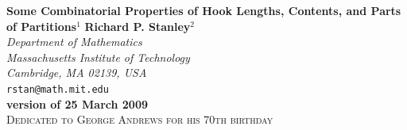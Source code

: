 \documentclass[12pt]{article}
\theoremstyle{definition}
\theoremstyle{remark}
\begin{document}
\newcommand{\beq}{\begin{equation}} 
\newcommand{\eeq}{\end{equation}}
\newcommand{\zz}{\mathbb{Z}}
\newcommand{\pp}{\mathbb{P}} 
\newcommand{\nn}{\mathbb{N}}
\newcommand{\qq}{\mathbb{Q}}
\newcommand{\rr}{\mathbb{R}}
\newcommand{\parn}{\mathrm{Par}(n)}
\newcommand{\bm}[1]{{\mbox{\boldmath $#1$}}}
\newcommand{\con}{\mathrm{Comp}(n)}
\newcommand{\sn}{\mathfrak{S}_n} 
\newcommand{\fs}{\mathfrak{S}}
\newcommand{\st}{\,:\,} 
\newcommand{\as}{\mathrm{as}}
\newcommand{\is}{\mathrm{is}}
\newcommand{\lgn}{\mathrm{len}}
\newcommand{\dis}{\displaystyle}
\newcommand{\bea}{\begin{eqnarray}}
\newcommand{\eea}{\end{eqnarray}}
\newcommand{\be}{\begin{enumerate}}
\newcommand{\ee}{\end{enumerate}}
\newcommand{\beas}{\begin{eqnarray*}}
\newcommand{\eeas}{\end{eqnarray*}}
\newcommand{\ffac}[2]{\langle #1\rangle_{#2}}

\thispagestyle{empty}

\vskip 20pt
\begin{center}
{\large\bf Some Combinatorial Properties of Hook Lengths, Contents,
  and Parts of Partitions}$^1$
\vskip 15pt
{\bf Richard P. Stanley}$^2$\\[.1in]
{\it Department of Mathematics}\\ 
{\it Massachusetts Institute of Technology}\\
{\it Cambridge, MA 02139, USA}\\
{\texttt{rstan@math.mit.edu}}\\[.2in]
{\bf\small version of 25 March 2009}\\[.2in]
{\textsc{Dedicated to George Andrews for his 70th birthday}}
\end{center}

 \begin{abstract}
   The main result of this paper is a generalization of a conjecture
   of Guoniu Han, originally inspired by an identity of Nekrasov and
   Okounkov. Our result states that if $F$ is any symmetric function
   (say over $\qq$) and if
  $$ \Phi_n(F) = \frac{1}{n!}\sum_{\lambda\vdash n} f_\lambda^2\,
            F(h_u^2\st u\in\lambda), $$
where $h_u$ denotes the hook length of the square $u$ of the partition
$\lambda$ of $n$ and $f_\lambda$ is the number of standard Young
tableaux of shape $\lambda$, then $\Phi_n(F)$ is a polynomial function
of $n$. A similar result is obtained when $F(h_u^2\st u\in\lambda)$ is
replaced with a function that is symmetric separately in the contents
$c_u$ of $\lambda$ and the shifted parts $\lambda_i+n-i$ of $\lambda$.
 \end{abstract}
\end{document}
